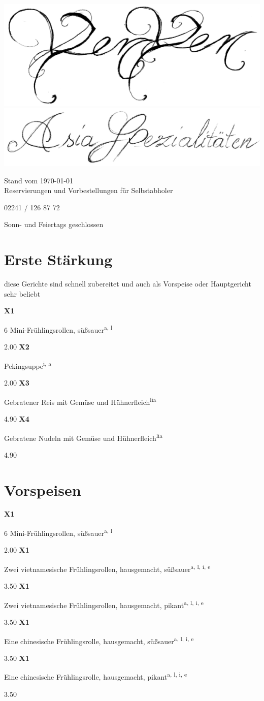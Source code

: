 \documentclass[a4paper,10pt,notumble]{leaflet}
\newcommand{\meal}[4]{\textbf{#1}\hspace{3mm}%
\begin{minipage}[t]{5.5 cm}
\begin{flushleft}
#2\textsuperscript{#3}
\end{flushleft}
\end{minipage}%
\hfill\SI{#4}{\EUR}\newline}
\newcommand{\Getreideprodukte}{a}
\newcommand{\Sellerie}{e}
\newcommand{\Eier}{i}
\newcommand{\Soja}{l}
\begin{document}
 

\begin{center}
\includegraphics[width=\textwidth]{gfx/yenyen_head}
\includegraphics[width=\textwidth]{gfx/Asia_Spezialitaeten}
\end{center}

{\small Stand vom \today}\\



Reservierungen und Vorbestellungen für Selbstabholer

{\Huge 02241 / 126 87 72}

Sonn- und Feiertags geschlossen\\

\section*{Erste Stärkung}
diese Gerichte sind schnell zubereitet und 
auch als Vorspeise oder Hauptgericht sehr beliebt
\begin{flushleft}
\meal{X1}{6 Mini-Frühlingsrollen, süßsauer}{\Getreideprodukte, \Soja}{2.00}
\meal{X2}{Pekingsuppe}{\Eier, \Getreideprodukte}{2.00}
\meal{X3}{Gebratener Reis mit Gemüse und Hühnerfleich}{\Soja \Eier \Getreideprodukte}{4.90}
\meal{X4}{Gebratene Nudeln mit Gemüse und Hühnerfleich}{\Soja \Eier \Getreideprodukte}{4.90}
\end{flushleft}

\section*{Vorspeisen}
\meal{X1}{6 Mini-Frühlingsrollen, süßsauer}{\Getreideprodukte, \Soja}{2.00}
\meal{X1}{Zwei vietnamesische Frühlingsrollen, hausgemacht, süßsauer}{\Getreideprodukte, \Soja, \Eier, \Sellerie}{3.50}
\meal{X1}{Zwei vietnamesische Frühlingsrollen, hausgemacht, pikant}{\Getreideprodukte, \Soja, \Eier, \Sellerie}{3.50}
\meal{X1}{Eine chinesische Frühlingsrolle, hausgemacht, süßsauer}{\Getreideprodukte, \Soja, \Eier, \Sellerie}{3.50}
\meal{X1}{Eine chinesische Frühlingsrolle, hausgemacht, pikant}{\Getreideprodukte, \Soja, \Eier, \Sellerie}{3.50}
\end{document}

